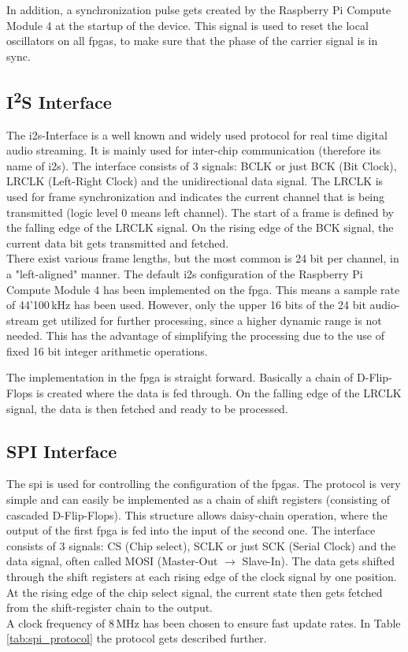 In addition, a synchronization pulse gets created by the Raspberry Pi Compute Module 4 at the startup of the device. This signal is used to reset the local oscillators on all \acrshort{fpga}s, to make sure that the phase of the carrier signal is in sync.

\subsection{I\textsuperscript{2}S Interface} \label{fpga_i2s}
The \acrshort{i2s}-Interface is a well known and widely used protocol for real time digital audio streaming. It is mainly used for inter-chip communication (therefore its name of \acrlong{i2s}). The interface consists of 3 signals: BCLK or just BCK (Bit Clock), LRCLK (Left-Right Clock) and the unidirectional data signal. The LRCLK is used for frame synchronization and indicates the current channel that is being transmitted (logic level 0 means left channel). The start of a frame is defined by the falling edge of the LRCLK signal. On the rising edge of the BCK signal, the current data bit gets transmitted and fetched.\\
There exist various frame lengths, but the most common is 24 bit per channel, in a "left-aligned" manner. The default \acrshort{i2s} configuration of the Raspberry Pi Compute Module 4 has been implemented on the \acrshort{fpga}. This means a sample rate of 44'100\,kHz has been used. However, only the upper 16 bits of the 24 bit audio-stream get utilized for further processing, since a higher dynamic range is not needed. This has the advantage of simplifying the processing due to the use of fixed 16 bit integer arithmetic operations.

The implementation in the \acrshort{fpga} is straight forward. Basically a chain of D-Flip-Flops is created where the data is fed through. On the falling edge of the LRCLK signal, the data is then fetched and ready to be processed.


\newpage
\subsection{SPI Interface} \label{fpga_spi}
The \acrfull{spi} is used for controlling the configuration of the \acrshort{fpga}s. The protocol is very simple and can easily be implemented as a chain of shift registers (consisting of cascaded D-Flip-Flops). This structure allows daisy-chain operation, where the output of the first \acrshort{fpga} is fed into the input of the second one. The interface consists of 3 signals: CS (Chip select), SCLK or just SCK (Serial Clock) and the data signal, often called MOSI (Master-Out $\rightarrow$ Slave-In). The data gets shifted through the shift registers at each rising edge of the clock signal by one position. At the rising edge of the chip select signal, the current state then gets fetched from the shift-register chain to the output. \\
A clock frequency of 8\,MHz has been chosen to ensure fast update rates. In Table \ref{tab:spi_protocol} the protocol gets described further.


